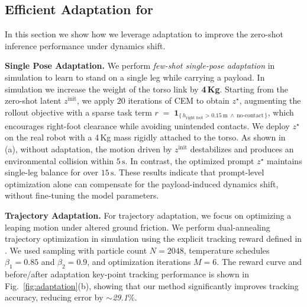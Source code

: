 \vspace{-0.3cm}

\subsection{Efficient Adaptation for \method{}}
\vspace{-2mm}
In this section we show how we leverage adaptation to improve the zero-shot inference performance under dynamics shift.

\textbf{Single Pose Adaptation.} We perform \emph{few-shot single-pose adaptation} in simulation to learn to stand on a single leg while carrying a payload. In simulation we increase the weight of the torso link by \textbf{4\,Kg}. Starting from the zero-shot latent $z^{\text{init}}$, we apply $20$ iterations of CEM to obtain $z^{\star}$, augmenting the rollout objective with a sparse task term $r\;=\;\mathbf{1}_{\{\,h_{\text{right foot}}>0.15~\mathrm{m}\ \wedge\ \text{no-contact}\,\}}$, 
which encourages right-foot clearance while avoiding unintended contacts. We deploy $z^\star$ on the real robot with a 4\,Kg mass rigidly attached to the torso.
As shown in~\,(a), without adaptation, the motion driven by $z^{\text{init}}$ destabilizes and produces an environmental collision within $5\,\mathrm{s}$. In contrast, the optimized prompt $z^{\star}$ maintains single-leg balance for over $15\,\mathrm{s}$. These results indicate that prompt-level optimization alone can compensate for the payload-induced dynamics shift, without fine-tuning the model parameters.

\textbf{Trajectory Adaptation.}
For trajectory adaptation, we focus on optimizing a leaping motion under altered ground friction. We perform dual-annealing trajectory optimization \citep{xue2025full} in simulation using the explicit tracking reward defined in \citep{Luo2023phc}. We used sampling with particle count $N = 2048$, temperature schedules $\beta_{1} = 0.85$ and $\beta_{2} = 0.9$, and optimization iterations $M = 6$. The reward curve and before/after adaptation key-point tracking performance is shown in Fig.~\ref{fig:adaptation}(b), showing that our method significantly improves tracking accuracy, reducing error by $\sim$\emph{29.1}\%.


